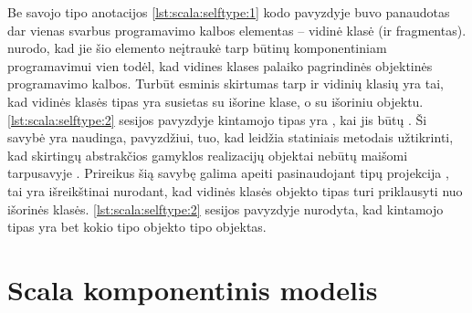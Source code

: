 Be savojo tipo anotacijos \ref{lst:scala:selftype:1} kodo pavyzdyje buvo
panaudotas dar vienas svarbus programavimo kalbos elementas – vidinė
klasė (ir fragmentas). \cite[12]{scalable-component-abstractions}
nurodo, kad jie šio elemento neįtraukė tarp būtinų komponentiniam
programavimui vien todėl, kad vidines klases palaiko pagrindinės
 objektinės programavimo kalbos. Turbūt esminis
skirtumas tarp  ir  vidinių klasių
yra tai, kad  vidinės klasės tipas yra susietas su
išorine klase, o  su išoriniu objektu.
\ref{lst:scala:selftype:2}  sesijos pavyzdyje kintamojo
 tipas yra , kai  jis
būtų . Ši savybė yra naudinga, pavyzdžiui, tuo, kad 
leidžia statiniais metodais užtikrinti, kad skirtingų abstrakčios
gamyklos  realizacijų objektai nebūtų maišomi
tarpusavyje \cite[36]{scala-design-patterns}. Prireikus šią savybę
galima apeiti pasinaudojant tipų projekcija ,
tai yra išreikštinai nurodant, kad vidinės klasės objekto tipas
turi priklausyti nuo išorinės klasės. \ref{lst:scala:selftype:2}
sesijos pavyzdyje nurodyta, kad kintamojo  tipas yra
bet kokio  tipo objekto  tipo objektas.

\section{Scala komponentinis modelis}


